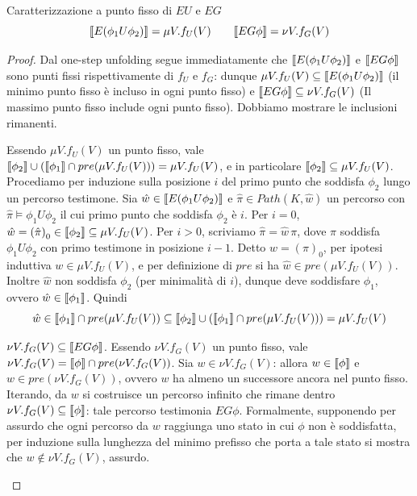 \begin{theorem}{Caratterizzazione a punto fisso di \(EU\) e \(EG\)}
  \[\den{E (\phi_1 U \phi_2)} = \mu V . f_U(V) \qquad \den{EG \phi} = \nu V . f_G(V)\]
\end{theorem}
\begin{proof}
  Dal one-step unfolding segue immediatamente che \(\den{E (\phi_1 U \phi_2)}\) e \(\den{EG\phi}\) sono punti fissi rispettivamente di \(f_U\) e \(f_G\): dunque \(\mu V . f_U(V)\subseteq \den{E (\phi_1 U \phi_2)}\) (il minimo punto fisso è incluso in ogni punto fisso) e \(\den{EG \phi} \subseteq \nu V. f_G(V)\) (Il massimo punto fisso include ogni punto fisso). Dobbiamo mostrare le inclusioni rimanenti.

  \begin{description}
    \item[\(\den{E (\phi_1 U \phi_2)} \subseteq \mu V . f_U(V)\).] 
    Essendo \(\mu V.f_U(V)\) un punto fisso, vale \(\den{\phi_2} \cup \left(\den{\phi_1}\cap pre(\mu V . f_U(V))\right) = \mu V . f_U(V)\), e in particolare \(\den{\phi_2} \subseteq \mu V . f_U(V)\).
    Procediamo per induzione sulla posizione \(i\) del primo punto che soddisfa \(\phi_2\) lungo un percorso testimone. Sia \(\hat{w} \in \den{E(\phi_1 U \phi_2)}\) e \(\hat{\pi} \in Path(K,\hat{w})\) un percorso con \(\hat\pi \models \phi_1 U \phi_2\) il cui primo punto che soddisfa \(\phi_2\) è \(i\).
    Per \(i = 0\), \(\hat{w} = {(\hat{\pi})}_0 \in \den{\phi_2} \subseteq \mu V . f_U(V)\).
    Per \(i > 0\), scriviamo \(\hat{\pi} = \hat{w}\, \pi\), dove \(\pi\) soddisfa \(\phi_1 U \phi_2\) con primo testimone in posizione \(i - 1\). Detto \(w = {(\pi)}_0\), per ipotesi induttiva \(w \in \mu V . f_U(V)\), e per definizione di \(pre\) si ha \(\hat{w} \in pre(\mu V . f_U(V))\). Inoltre \(\hat{w}\) non soddisfa \(\phi_2\) (per minimalità di \(i\)), dunque deve soddisfare \(\phi_1\), ovvero \(\hat{w}\in \den{\phi_1}\). Quindi
    \[\hat{w}\in \den{\phi_1}\cap pre(\mu V . f_U(V))\subseteq \den{\phi_2}\cup \left(\den{\phi_1}\cap pre(\mu V . f_U(V))\right) = \mu V . f_U(V)\]
    
    \item{\(\nu V . f_G(V) \subseteq \den{EG \phi}\).}
    Essendo \(\nu V . f_G(V)\) un punto fisso, vale \(\nu V . f_G(V) = \den{\phi} \cap pre(\nu V . f_G(V))\). Sia \(w \in \nu V . f_G(V)\): allora \(w \in \den{\phi}\) e \(w \in pre(\nu V . f_G(V))\), ovvero \(w\) ha almeno un successore ancora nel punto fisso. Iterando, da \(w\) si costruisce un percorso infinito che rimane dentro \(\nu V . f_G(V) \subseteq \den{\phi}\): tale percorso testimonia \(EG\phi\). Formalmente, supponendo per assurdo che ogni percorso da \(w\) raggiunga uno stato in cui \(\phi\) non è soddisfatta, per induzione sulla lunghezza del minimo prefisso che porta a tale stato si mostra che \(w \notin \nu V . f_G(V)\), assurdo.
  \end{description}
\end{proof}

